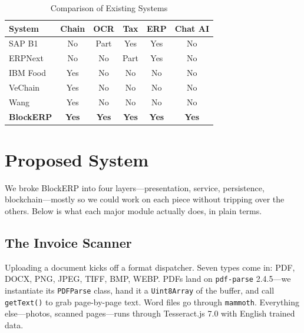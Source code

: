 \documentclass[conference]{IEEEtran}
\begin{document}
\begin{table}[htbp]
\caption{Comparison of Existing Systems}
\begin{center}
\renewcommand{\arraystretch}{1.2}
\begin{tabular}{|p{1.5cm}|c|c|c|c|c|}
\hline
\textbf{System} & \textbf{Chain} & \textbf{OCR} & \textbf{Tax} & \textbf{ERP} & \textbf{Chat AI} \\
\hline
SAP B1 & No & Part & Yes & Yes & No \\
\hline
ERPNext & No & No & Part & Yes & No \\
\hline
IBM Food & Yes & No & No & No & No \\
\hline
VeChain & Yes & No & No & No & No \\
\hline
Wang \cite{b11} & Yes & No & No & No & No \\
\hline
\textbf{BlockERP} & \textbf{Yes} & \textbf{Yes} & \textbf{Yes} & \textbf{Yes} & \textbf{Yes} \\
\hline
\end{tabular}
\label{tab_comparison}
\end{center}
\end{table}

\section{Proposed System}

We broke BlockERP into four layers---presentation, service, persistence, blockchain---mostly so we could work on each piece without tripping over the others. Below is what each major module actually does, in plain terms.

\subsection{The Invoice Scanner}
Uploading a document kicks off a format dispatcher. Seven types come in: PDF, DOCX, PNG, JPEG, TIFF, BMP, WEBP. PDFs land on \texttt{pdf-parse} 2.4.5---we instantiate its \texttt{PDFParse} class, hand it a \texttt{Uint8Array} of the buffer, and call \texttt{getText()} to grab page-by-page text. Word files go through \texttt{mammoth}. Everything else---photos, scanned pages---runs through Tesseract.js 7.0 with English trained data.
\end{document}
